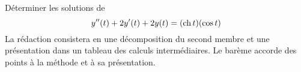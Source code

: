 Déterminer les solutions de
\begin{displaymath}
 y''(t) + 2y'(t) + 2y(t)= (\operatorname{ch} t)(\cos t) 
\end{displaymath}
La rédaction consistera en une décomposition du second membre et une présentation dans un tableau des calculs intermédiaires. Le barème accorde des points à la méthode et à sa présentation.